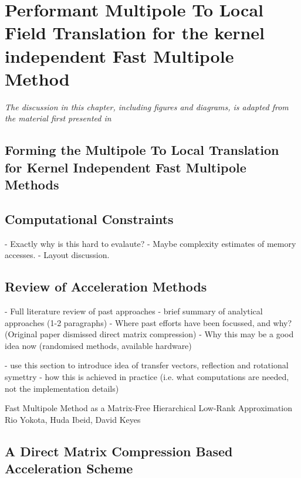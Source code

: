\chapter{Performant Multipole To Local Field Translation for the kernel independent Fast Multipole Method}\label{chpt:field_translation}
\thispagestyle{chaptertitle} %

\begin{center}
    \textit{The discussion in this chapter, including figures and diagrams, is adapted from the material first presented in \cite{kailasa2024m2ltranslationoperatorskernel} }
\end{center}


\section{Forming the Multipole To Local Translation for Kernel Independent Fast Multipole Methods}

\section{Computational Constraints}

- Exactly why is this hard to evalaute?
- Maybe complexity estimates of memory accesses.
- Layout discussion.


\section{Review of Acceleration Methods}

- Full literature review of past approaches
- brief summary of analytical approaches (1-2 paragraphs)
- Where past efforts have been focussed, and why? (Original paper dismissed direct matrix compression)
- Why this may be a good idea now (randomised methods, available hardware)

- use this section to introduce idea of transfer vectors, reflection and rotational symettry
- how this is achieved in practice (i.e. what computations are needed, not the implementation details)

Fast Multipole Method as a Matrix-Free Hierarchical Low-Rank Approximation
Rio Yokota, Huda Ibeid, David Keyes


\section{A Direct Matrix Compression Based Acceleration Scheme}

